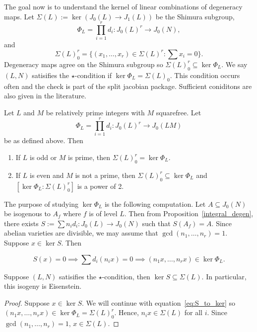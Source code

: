 \documentclass{article}
\begin{document}
The goal now is to understand the kernel of linear combinations of degeneracy
maps. Let $\Sigma(L):=\ker (J_0(L)\to J_1(L))$ be the Shimura subgroup,
\[
    \Phi_L = \prod_{i=1} ^r d_i : J_0(L)^r \to J_0(N),
\]
and
\[
    \Sigma(L)_0 ^r =\{(x_1,\ldots,x_r)\in \Sigma(L)^r: \sum x_i = 0\}.
\]
Degeneracy maps agree on the Shimura subgroup so $\Sigma(L)_0 ^r \subseteq
\ker\Phi_L$. We say $(L, N)$ satisifies the $\star$-condition if
$\ker\Phi_L=\Sigma(L)_0$. This condition occurs often and the check is part of
the split jacobian package. Sufficient coniditons are also given in the
literature.  
\begin{theorem}
    \label{ribet_ling}
    Let $L$ and $M$ be relatively prime integers with $M$ squarefree. Let
    \[
        \Phi_L = \prod_{i=1} ^r d_i  : J_0(L)^r \to J_0(LM)
    \]
    be as defined above. Then
    \begin{enumerate}
        \item 
            If $L$ is odd or $M$ is prime, then $\Sigma(L)_0 ^r=\ker\Phi_L$.
        \item
            If $L$ is even and $M$ is not a prime, then $\Sigma(L)_0 ^r
            \subseteq \ker\Phi_L$ and $[\ker\Phi_L: \Sigma(L)_0 ^r]$ is
            a power of 2.
    \end{enumerate}
\end{theorem}

The purpose of studying $\ker\Phi_L$ is the following computation. Let
$A\subseteq J_0(N)$ be isogenous to $A_f$ where $f$ is of level $L$. Then from
Proposition~\ref{integral_degen}, there exists $S:=\sum n_i d_i:J_0(L)\to
J_0(N)$ such that $S(A_f)=A$. Since abelian varieties are divisible, we may
assume that $\gcd(n_1, \ldots,n_r)=1$. Suppose $x\in \ker S$. Then 

\begin{equation}
    \label{eq:S_to_ker}
    S(x) = 0 \implies \sum d_i(n_i x) =0 \implies (n_1 x,\ldots,n_r x) \in
    \ker\Phi_L. 
\end{equation}

\begin{corollary}
    \label{cor:star}
    Suppose $(L, N)$ satisifies the $\star$-condition, then $\ker S\subseteq
    \Sigma(L)$. In particular, this isogeny is Eisenstein.
\end{corollary}
\begin{proof}
    Suppose $x\in \ker S$. We will continue with equation~\eqref{eq:S_to_ker}
    so $(n_1 x, \ldots, n_r x)\in \ker\Phi_L = \Sigma(L)_0 ^r$. Hence, $n_i x\in
    \Sigma(L)$ for all $i$. Since $\gcd(n_1,\ldots,n_r)=1$, $x\in \Sigma(L)$.
\end{proof}
\end{document}
